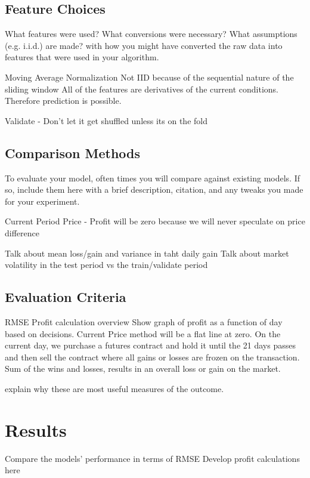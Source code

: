 \documentclass[twoside,11pt]{article}
\begin{document}
\subsection{Feature Choices}
What features were used? What conversions were necessary? What assumptions (e.g. i.i.d.) are made? with how you might have converted the raw data into features that were used in your algorithm.

  Moving Average
  Normalization
  Not IID because of the sequential nature of the sliding window
  All of the features are derivatives of the current conditions. Therefore prediction is possible.

  Validate - Don't let it get shuffled unless its on the fold


\subsection{Comparison Methods}
To evaluate your model, often times you will compare against existing models.
If so, include them here with a brief description, citation, and any tweaks you made for your experiment.

Current Period Price - Profit will be zero because we will never speculate on price
difference

  Talk about mean loss/gain and variance in taht daily gain
  Talk about market volatility in the test period vs the train/validate period

\subsection{Evaluation Criteria}

RMSE
Profit calculation overview
  Show graph of profit as a function of day based on decisions. Current Price method will be a flat line at zero.
  On the current day, we purchase a futures contract and hold it until the 21 days passes and then sell the contract where all gains or losses are frozen on the transaction.
  Sum of the wins and losses, results in an overall loss or gain on the market.

explain why these are most useful measures of the outcome.

\section{Results} \label{results}

Compare the models' performance in terms of RMSE
Develop profit calculations here
\end{document}

